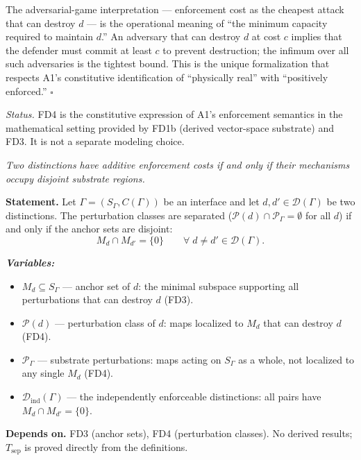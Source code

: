 \documentclass[11pt]{article}
\theoremstyle{remark}
\newenvironment{varlist}{\begin{itemize}[nosep,leftmargin=2em]}{\end{itemize}}
\begin{document}
The adversarial-game interpretation --- enforcement cost as the cheapest attack that can destroy $d$ --- is the operational meaning of ``the minimum capacity required to maintain $d$.''  An adversary that can destroy $d$ at cost $c$ implies that the defender must commit at least $c$ to prevent destruction; the infimum over all such adversaries is the tightest bound.  This is the unique formalization that respects A1's constitutive identification of ``physically real'' with ``positively enforced.''  \hfill$\square$

\smallskip\noindent\textit{Status.}  FD4 is the constitutive expression of A1's enforcement semantics in the mathematical setting provided by FD1b (derived vector-space substrate) and FD3.  It is not a separate modeling choice.

\begin{tcolorbox}[apfbox, title={Theorem $T_{\mathrm{sep}}$ (Separation Biconditional)}]
\textit{Two distinctions have additive enforcement costs if and only if their mechanisms occupy disjoint substrate regions.}

\smallskip\noindent\textbf{Statement.}  Let $\Gamma = (S_\Gamma, C(\Gamma))$ be an interface and let $d, d' \in \mathcal{D}(\Gamma)$ be two distinctions.  The perturbation classes are separated ($\mathcal{P}(d) \cap \mathcal{P}_\Gamma = \emptyset$ for all $d$) if and only if the anchor sets are disjoint:
\begin{equation}
M_d \cap M_{d'} = \{0\} \qquad \forall\; d \neq d' \in \mathcal{D}(\Gamma).
\label{eq:disjoint_support}
\end{equation}

\smallskip\noindent\textbf{\textit{Variables:}}
\begin{varlist}
\item $M_d \subseteq S_\Gamma$ --- anchor set of $d$: the minimal subspace supporting all perturbations that can destroy $d$ (FD3).
\item $\mathcal{P}(d)$ --- perturbation class of $d$: maps localized to $M_d$ that can destroy $d$ (FD4).
\item $\mathcal{P}_\Gamma$ --- substrate perturbations: maps acting on $S_\Gamma$ as a whole, not localized to any single $M_d$ (FD4).
\item $\mathcal{D}_{\mathrm{ind}}(\Gamma)$ --- the independently enforceable distinctions: all pairs have $M_d \cap M_{d'} = \{0\}$.
\end{varlist}

\smallskip\noindent\textbf{Depends on.}  FD3 (anchor sets), FD4 (perturbation classes).  No derived results; $T_{\mathrm{sep}}$ is proved directly from the definitions.


\end{tcolorbox}
\end{document}
